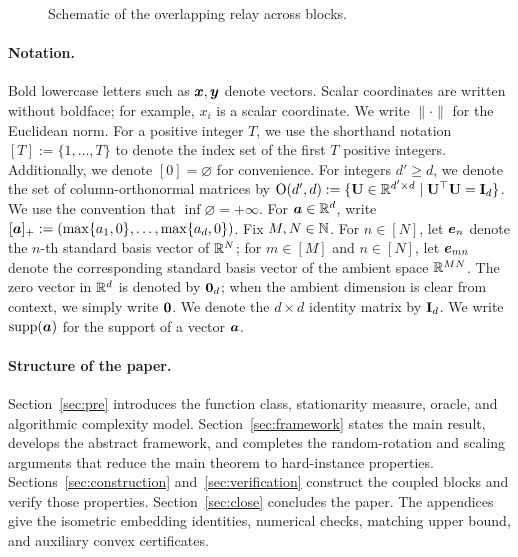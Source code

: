 \begin{figure}[t]
\caption{Schematic of the overlapping relay across blocks.}
\label{fig:overlapping-relay}
\end{figure}

\paragraph{Notation.}
Bold lowercase letters such as $\bm{x},\bm{y}$ denote vectors.  Scalar coordinates are written without boldface; for example, $x_i$ is a scalar coordinate.  We write $\|\cdot\|$ for the Euclidean norm. For a positive integer $T$, we use the shorthand notation $[T] := \{1,\ldots,T\}$ to denote the index set of the first $T$ positive integers. Additionally, we denote $[0]=\varnothing$ for convenience. For integers \(d'\ge d\), we denote the set of column-orthonormal matrices by $
        \mbox{O}(d',d)
        :=
        \{\mathbf U\in\mathbb R^{d'\times d}\mid
        \mathbf U^\top\mathbf U={\mathbf{I}}_d\}$. 
        We use the convention that \(\inf\varnothing=+\infty\).
        For $\bm{a}\in{\mathbb{R}}^d$, write $[\bm{a}]_+:=(\max\{a_1,0\},\ldots,\max\{a_d,0\})$. Fix $M,N\in{\mathbb{N}}$. For $n\in[N]$, let $\bm{e}_n$ denote the $n$-th standard basis vector of ${\mathbb{R}}^N$; for $m\in[M]$ and $n\in[N]$, let $\bm{e}_{mn}$ denote the corresponding
standard basis vector of the ambient space ${\mathbb{R}}^{MN}$. 
The zero vector in \({\mathbb{R}}^d\) is denoted by \({\mathbf 0}_d\); when the ambient
dimension is clear from context, we simply write \({\mathbf 0}\). We denote the \(d\times d\) identity matrix by \({\mathbf{I}}_d\). We write $\operatorname{supp}(\bm{a})$ for the support of a vector $\bm{a}$.
        

\begingroup
\color{black}
\paragraph{Structure of the paper.}
Section~\ref{sec:pre} introduces the function class, stationarity
measure, oracle, and algorithmic complexity model.
Section~\ref{sec:framework} states the main result, develops
the abstract framework, and completes the random-rotation and scaling
arguments that reduce the main theorem to hard-instance properties.
Sections~\ref{sec:construction} and~\ref{sec:verification}
construct the coupled blocks and verify those properties.
Section~\ref{sec:close} concludes the paper.
The appendices give the isometric embedding identities, numerical
checks, matching upper bound, and auxiliary convex certificates.
\endgroup




